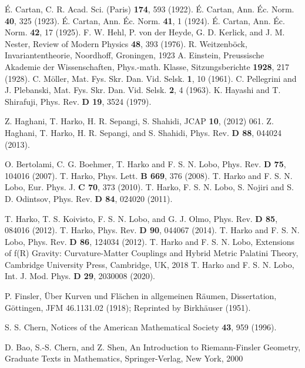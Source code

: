 \documentclass[aps,superscriptaddress, showpacs,preprintnumbers, superscriptaddress, nofootinbibt,twocolumn]{revtex4-2}
\begin{document}
\begin{thebibliography}{99}
 \'{E}. Cartan, C. R. Acad. Sci. (Paris)  {\bf 174}, 593 (1922).
 \'{E}. Cartan, Ann. \'{E}c. Norm.  {\bf 40}, 325 (1923).
 \'{E}. Cartan, Ann.  \'{E}c. Norm.  {\bf 41}, 1 (1924).
 \'{E}. Cartan, Ann. \'{E}c. Norm.  {\bf 42}, 17 (1925).
 F. W. Hehl, P. von der Heyde, G. D. Kerlick, and J. M.
Nester, Review of Modern Physics {\bf 48}, 393 (1976).
 R. Weitzenb\"{o}ck, Invariantentheorie, Noordhoff, Groningen, 1923
 A. Einstein, Preussische Akademie der Wissenschaften,
Phys.-math. Klasse, Sitzungsberichte {\bf 1928}, 217 (1928).
 C. M\"{o}ller, Mat. Fys. Skr. Dan. Vid. Selsk. {\bf 1}, 10 (1961).
 C. Pellegrini and J. Plebanski, Mat. Fys. Skr. Dan. Vid.
Selsk. {\bf 2}, 4 (1963).
 K. Hayashi and T. Shirafuji, Phys. Rev. {\bf D 19}, 3524
(1979).

 Z. Haghani, T. Harko, H. R. Sepangi, S. Shahidi, JCAP
{\bf 10}, (2012) 061.
 Z. Haghani, T. Harko, H. R. Sepangi, and S. Shahidi,
Phys. Rev. {\bf D 88}, 044024 (2013).

  O. Bertolami, C. G. Boehmer, T. Harko and F. S. N.
Lobo, Phys. Rev. {\bf D 75}, 104016 (2007).
 T. Harko, Phys. Lett. {\bf B 669}, 376 (2008).
 T. Harko and F. S. N. Lobo, Eur. Phys. J. {\bf C 70}, 373
(2010).
  T. Harko, F. S. N. Lobo, S. Nojiri and S. D. Odintsov,
Phys. Rev. {\bf D 84}, 024020 (2011).

 T. Harko, T. S. Koivisto, F. S. N. Lobo, and G. J. Olmo, Phys. Rev. {\bf D 85}, 084016 (2012).
 T. Harko, Phys. Rev. {\bf D 90}, 044067 (2014).
 T. Harko and F. S. N. Lobo, Phys. Rev. {\bf D 86}, 124034
(2012).
 T. Harko and F. S. N. Lobo, Extensions of f(R) Gravity:
Curvature-Matter Couplings and Hybrid Metric Palatini Theory, Cambridge University Press, Cambridge,
UK, 2018
 T. Harko and F. S. N. Lobo, Int. J. Mod. Phys. {\bf D 29}, 2030008 (2020).

 P. Finsler, \"{U}ber Kurven und Fl\"{a}chen in allgemeinen R\"{a}umen, Dissertation, G\"{o}ttingen, JFM 46.1131.02 (1918); Reprinted by Birkh\"{a}user (1951).

 S. S. Chern, Notices of the American Mathematical Society {\bf 43}, 959  (1996).

 D. Bao, S.-S. Chern, and Z. Shen, An Introduction to
Riemann-Finsler Geometry, Graduate Texts in Mathematics, Springer-Verlag,
New York, 2000


\end{thebibliography}
\end{document}
